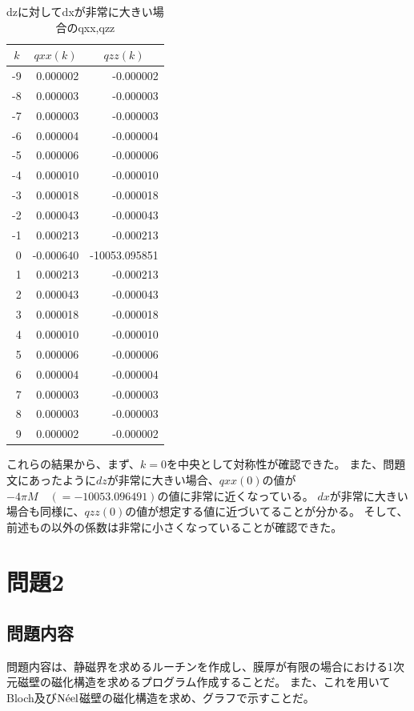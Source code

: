 \documentclass{jsarticle}
\begin{document}
\begin{table}[H]
\begin{minipage}{0.4\columnwidth}
		\begin{tabular}{rrr}					\toprule
			\multicolumn{1}{c}{$k$} &
			\multicolumn{1}{c}{$qxx(k)$} &
			\multicolumn{1}{c}{$qzz(k)$} 		\\ \midrule
			-9 & 0.000002 & ~-0.000002 \\[-4pt]
			-8 & 0.000003 & ~-0.000003 \\[-4pt]
			-7 & 0.000003 & ~-0.000003 \\[-4pt]
			-6 & 0.000004 & ~-0.000004 \\[-4pt]
			-5 & 0.000006 & ~-0.000006 \\[-4pt]
			-4 & 0.000010 & ~-0.000010 \\[-4pt]
			-3 & 0.000018 & ~-0.000018 \\[-4pt]
			-2 & 0.000043 & ~-0.000043 \\[-4pt]
			-1 & 0.000213 & ~-0.000213 \\[-4pt]
			0 & -0.000640 & -10053.095851 \\[-4pt]
			1 & 0.000213 & ~-0.000213 \\[-4pt]
			2 & 0.000043 & ~-0.000043 \\[-4pt]
			3 & 0.000018 & ~-0.000018 \\[-4pt]
			4 & 0.000010 & ~-0.000010 \\[-4pt]
			5 & 0.000006 & ~-0.000006 \\[-4pt]
			6 & 0.000004 & ~-0.000004 \\[-4pt]
			7 & 0.000003 & ~-0.000003 \\[-4pt]
			8 & 0.000003 & ~-0.000003 \\[-4pt]
			9 & 0.000002 & ~-0.000002 \\ \bottomrule
		\end{tabular}
		\caption{dzに対してdxが非常に大きい場合のqxx,qzz}
		\label{tab02}
	\end{minipage}
\end{table}

これらの結果から、まず、$k=0$を中央として対称性が確認できた。
また、問題文にあったように$dz$が非常に大きい場合、$qxx(0)$の値が$-4\pi M\quad (=-10053.096491)$の値に非常に近くなっている。
$dx$が非常に大きい場合も同様に、$qzz(0)$の値が想定する値に近づいてることが分かる。
そして、前述もの以外の係数は非常に小さくなっていることが確認できた。

\section{問題2}
\subsection{問題内容}
問題内容は、静磁界を求めるルーチンを作成し、膜厚が有限の場合における1次元磁壁の磁化構造を求めるプログラム作成することだ。
また、これを用いてBloch及び$\mathrm{N\Acute{e}el}$磁壁の磁化構造を求め、グラフで示すことだ。
\end{document}
